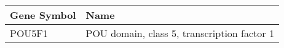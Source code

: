 \begin{tabular}{ll}
\toprule
Gene Symbol &                                        Name \\
\midrule
     POU5F1 & POU domain, class 5, transcription factor 1 \\
\bottomrule
\end{tabular}
